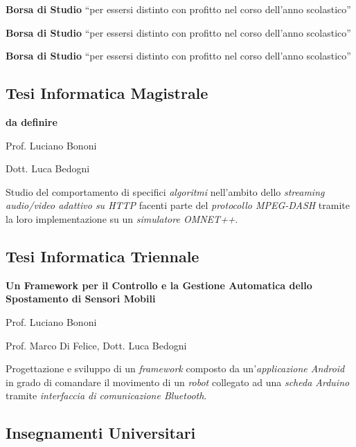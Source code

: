 {\textbf{Borsa di Studio} ``per essersi distinto con profitto nel corso
dell'anno scolastico''}

{\textbf{Borsa di Studio} ``per essersi distinto con profitto nel corso
dell'anno scolastico''}

{\textbf{Borsa di Studio} ``per essersi distinto con profitto nel corso
dell'anno scolastico''}



\subsection{Tesi Informatica Magistrale}

{\textbf{da definire}}

{Prof. Luciano Bononi}

{Dott. Luca Bedogni}

{Studio del comportamento di specifici \textit{algoritmi} nell'ambito dello
\textit{streaming audio/video adattivo su HTTP} facenti parte del
\textit{protocollo MPEG-DASH} tramite la loro implementazione su un
\textit{simulatore OMNET++}.}



\subsection{Tesi Informatica Triennale}

{\textbf{Un Framework per il Controllo e la Gestione Automatica dello
Spostamento di Sensori Mobili}}

{Prof. Luciano Bononi}

{Prof. Marco Di Felice, Dott. Luca Bedogni}

{Progettazione e sviluppo di un \textit{framework} composto da
un'\textit{applicazione Android} in grado di comandare il movimento di un
\textit{robot} collegato ad una \textit{scheda Arduino} tramite
\textit{interfaccia di comunicazione Bluetooth}.}

\subsection{Insegnamenti Universitari}

